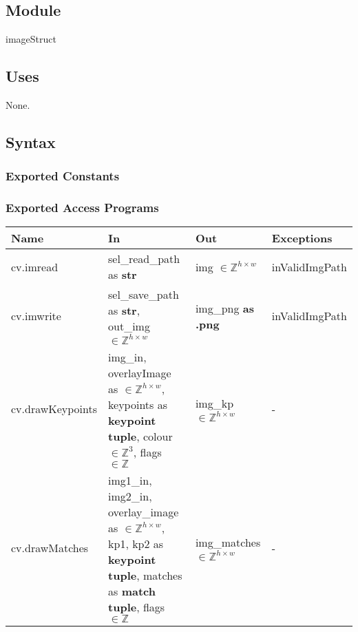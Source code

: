\documentclass[12pt, titlepage]{article}
\begin{document}

\subsection{Module}

imageStruct

\subsection{Uses}
None.

\subsection{Syntax}

\subsubsection{Exported Constants}

\subsubsection{Exported Access Programs}

\begin{center}
\begin{tabular}{p{3.5cm} p{3.5cm} p{3.5cm} p{3cm}}
\hline
\textbf{Name} & \textbf{In} & \textbf{Out} & \textbf{Exceptions} \\
\hline
cv.imread & sel\_read\_path as \textbf{str} & 
img $\in \mathbb{Z}^{h \times w}$ & inValidImgPath \\
\hline
cv.imwrite & sel\_save\_path as \textbf{str}, \newline 
out\_img $\in \mathbb{Z}^{h \times w}$ & 
img\_png \textbf{as .png} & inValidImgPath \\
\hline
cv.drawKeypoints & img\_in, overlayImage as $\in \mathbb{Z}^{h \times w}$, \newline
keypoints as \textbf{keypoint tuple}, \newline
colour $\in \mathbb{Z}^{3}$, \newline 
flags $\in \mathbb{Z}$ & img\_kp $\in \mathbb{Z}^{h \times w}$ & - \\
\hline
cv.drawMatches & img1\_in, img2\_in, overlay\_image as $\in 
\mathbb{Z}^{h \times w}$, \newline
kp1, kp2 as \textbf{keypoint tuple}, \newline
matches as \textbf{match tuple}, \newline
flags $\in \mathbb{Z}$ 
& img\_matches $\in \mathbb{Z}^{h \times w}$ & - \\
\hline
\end{tabular}
\end{center}
\end{document}
